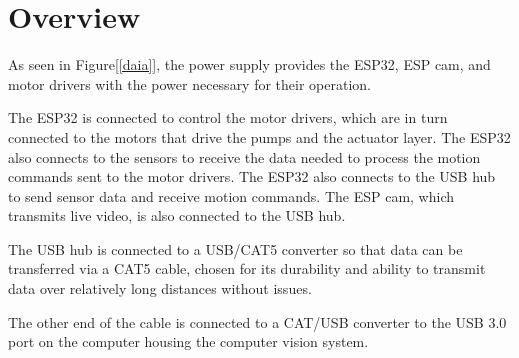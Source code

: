 \documentclass[onecolumn]{cwpreport} %
\begin{document}
\section{Overview}
As seen in Figure[\ref{daia}], the power supply provides the ESP32, ESP cam, and motor drivers with the power necessary for their operation.

The ESP32 is connected to control the motor drivers, which are in turn connected to the motors that drive the pumps and the actuator layer. The ESP32 also connects to the sensors to receive the data needed to process the motion commands sent to the motor drivers. The ESP32 also connects to the USB hub to send sensor data and receive motion commands. The ESP cam, which transmits live video, is also connected to the USB hub.

The USB hub is connected to a USB/CAT5 converter so that data can be transferred via a CAT5 cable, chosen for its durability and ability to transmit data over relatively long distances without issues.

The other end of the cable is connected to a CAT/USB converter to the USB 3.0 port on the computer housing the computer vision system.
\end{document}
